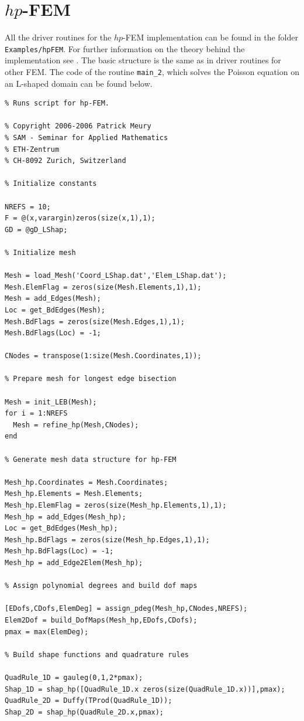 \section{$hp$-FEM}

All the driver routines for the $hp$-FEM implementation can be found in the folder \texttt{Examples/hpFEM}. For further information on the theory behind the implementation see \cite{S04}. The basic structure is the same as in driver routines for other FEM. The code of the routine \texttt{main\_2}, which solves the Poisson equation on an L-shaped domain can be found below.

\begin{lstlisting}
% Runs script for hp-FEM.

% Copyright 2006-2006 Patrick Meury
% SAM - Seminar for Applied Mathematics
% ETH-Zentrum
% CH-8092 Zurich, Switzerland

% Initialize constants
  
NREFS = 10;                          
F = @(x,varargin)zeros(size(x,1),1); 
GD = @gD_LShap;                      
  
% Initialize mesh
 
Mesh = load_Mesh('Coord_LShap.dat','Elem_LShap.dat');
Mesh.ElemFlag = zeros(size(Mesh.Elements,1),1);
Mesh = add_Edges(Mesh);
Loc = get_BdEdges(Mesh);
Mesh.BdFlags = zeros(size(Mesh.Edges,1),1);
Mesh.BdFlags(Loc) = -1;  
  
CNodes = transpose(1:size(Mesh.Coordinates,1));
  
% Prepare mesh for longest edge bisection 
  
Mesh = init_LEB(Mesh);
for i = 1:NREFS
  Mesh = refine_hp(Mesh,CNodes);
end 
  
% Generate mesh data structure for hp-FEM

Mesh_hp.Coordinates = Mesh.Coordinates;
Mesh_hp.Elements = Mesh.Elements;
Mesh_hp.ElemFlag = zeros(size(Mesh_hp.Elements,1),1);
Mesh_hp = add_Edges(Mesh_hp);
Loc = get_BdEdges(Mesh_hp);
Mesh_hp.BdFlags = zeros(size(Mesh_hp.Edges,1),1);
Mesh_hp.BdFlags(Loc) = -1;
Mesh_hp = add_Edge2Elem(Mesh_hp);

% Assign polynomial degrees and build dof maps
  
[EDofs,CDofs,ElemDeg] = assign_pdeg(Mesh_hp,CNodes,NREFS);
Elem2Dof = build_DofMaps(Mesh_hp,EDofs,CDofs);
pmax = max(ElemDeg);

% Build shape functions and quadrature rules

QuadRule_1D = gauleg(0,1,2*pmax);
Shap_1D = shap_hp([QuadRule_1D.x zeros(size(QuadRule_1D.x))],pmax);
QuadRule_2D = Duffy(TProd(QuadRule_1D));
Shap_2D = shap_hp(QuadRule_2D.x,pmax);


\end{lstlisting}
